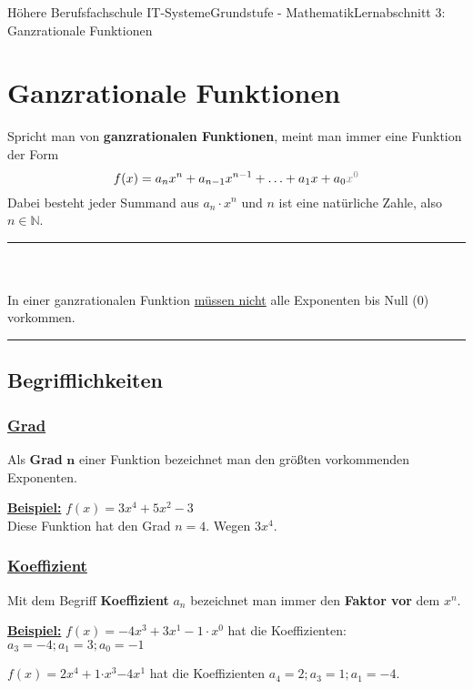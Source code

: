 \documentclass[11pt,twocolumn,oneside,openany,headings=optiontotoc,11pt,numbers=noenddot]{article}
\begin{document}
	\begin{worksheet}{Höhere Berufsfachschule IT-Systeme}{Grundstufe - Mathematik}{Lernabschnitt 3: Ganzrationale Funktionen}
		\setcounter{section}{5}
		\section{Ganzrationale Funktionen}
		Spricht man von \textbf{ganzrationalen Funktionen}, meint man immer eine Funktion der Form \[f(x) = a_nx^n + a_{n-1}x^{n-1} + \ldots + a_1x + a_0\color{codegray}{x^0}\] Dabei besteht jeder Summand aus \(a_n\cdot{}x^n\) und \(n\) ist eine natürliche Zahle, also \(n \in \mathbb{N}\).
		\par\noindent
		\rule{0.48\textwidth}{0.1pt}\\
		\underline{\color{red}{Vorsicht!}}\\
		In einer ganzrationalen Funktion \underline{müssen nicht} alle Exponenten bis Null (0) vorkommen.\\
		\rule{0.48\textwidth}{0.1pt}
		\subsection{Begrifflichkeiten}
		\subsubsection*{\underline{Grad}}
		Als \textbf{Grad} \(\mathbf{n}\) einer Funktion bezeichnet man den größten vorkommenden Exponenten.\\
		\par\noindent
		\textbf{\underline{Beispiel:}} \(f(x) = 3x^4 + 5x^2 -3\)\\
		Diese Funktion hat den Grad \(n = 4\). Wegen \(3x\)\colorbox{green!10}{\(^4\)}.
		\subsubsection*{\underline{Koeffizient}}
		Mit dem Begriff \textbf{Koeffizient} \(a_n\) bezeichnet man immer den \textbf{Faktor vor} dem \(x^n\).\\
		\par\noindent
		\underline{\textbf{Beispiel:}} \(f(x) = -4x^3 + 3x^{\mathit{1}} - 1\cdot{}\mathit{x^0}\) hat die Koeffizienten: \(a_3 = -4; a_1 = 3; a_0 = -1\)\\
		\par\noindent
		\(f(x) = \)\colorbox{green!10}{\(2\)}\(x^4 + \)\colorbox{green!10}{\(1\)}\(\cdot{}x^3 \)\colorbox{green!10}{\(- 4\)}\(x^{\mathit{1}}\) hat die Koeffizienten \(a_4 = 2; a_3 = 1; a_1 = -4\).

\end{worksheet}
\end{document}
